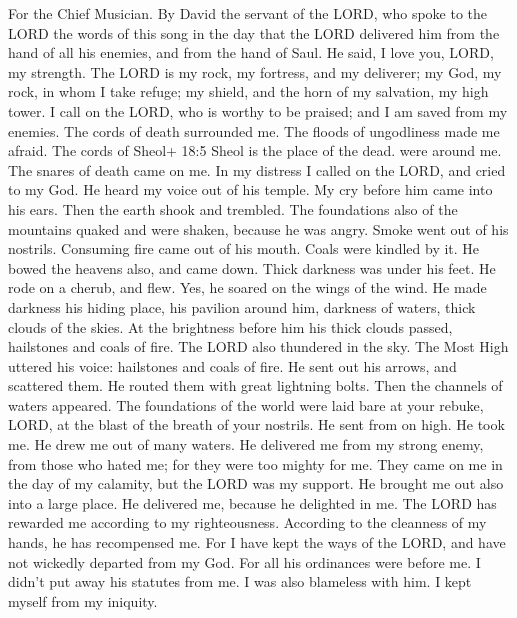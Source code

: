 For the Chief Musician. By David the servant of the LORD, who spoke to
the LORD the words of this song in the day that the LORD delivered him
from the hand of all his enemies, and from the hand of Saul. He said,
 I love you, LORD, my strength.  The LORD is my
rock, my fortress, and my deliverer; my God, my rock, in whom I take
refuge; my shield, and the horn of my salvation, my high tower.
 I call on the LORD, who is worthy to be praised; and I am
saved from my enemies.  The cords of death surrounded me.
The floods of ungodliness made me afraid.  The cords of
Sheol+ 18:5 Sheol is the place of the dead. were around me. The snares
of death came on me.  In my distress I called on the LORD,
and cried to my God. He heard my voice out of his temple. My cry before
him came into his ears.  Then the earth shook and trembled.
The foundations also of the mountains quaked and were shaken, because he
was angry.  Smoke went out of his nostrils. Consuming fire
came out of his mouth. Coals were kindled by it.  He bowed
the heavens also, and came down. Thick darkness was under his feet.
 He rode on a cherub, and flew. Yes, he soared on the wings
of the wind.  He made darkness his hiding place, his
pavilion around him, darkness of waters, thick clouds of the skies.
 At the brightness before him his thick clouds passed,
hailstones and coals of fire.  The LORD also thundered in
the sky. The Most High uttered his voice: hailstones and coals of fire.
 He sent out his arrows, and scattered them. He routed them
with great lightning bolts.  Then the channels of waters
appeared. The foundations of the world were laid bare at your rebuke,
LORD, at the blast of the breath of your nostrils.  He sent
from on high. He took me. He drew me out of many waters. 
He delivered me from my strong enemy, from those who hated me; for they
were too mighty for me.  They came on me in the day of my
calamity, but the LORD was my support.  He brought me out
also into a large place. He delivered me, because he delighted in me.
 The LORD has rewarded me according to my righteousness.
According to the cleanness of my hands, he has recompensed me.
 For I have kept the ways of the LORD, and have not
wickedly departed from my God.  For all his ordinances were
before me. I didn't put away his statutes from me.  I was
also blameless with him. I kept myself from my iniquity. 
